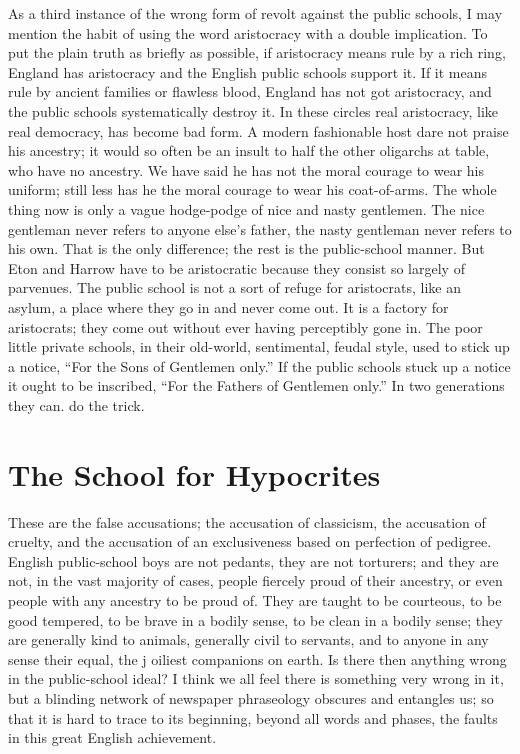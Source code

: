 \documentclass{book}
\begin{document}
As a third instance of the wrong form of revolt against the public schools, I may mention the habit of using the word aristocracy with a double implication. To put the plain truth as briefly as possible, if aristocracy means rule by a rich ring, England has aristocracy and the English public schools support it. If it means rule by ancient families or flawless blood, England has not got aristocracy, and the public schools systematically destroy it. In these circles real aristocracy, like real democracy, has become bad form. A modern fashionable host dare not praise his ancestry; it would so often be an insult to half the other oligarchs at table, who have no ancestry. We have said he has not the moral courage to wear his uniform; still less has he the moral courage to wear his coat-of-arms. The whole thing now is only a vague hodge-podge of nice and nasty gentlemen. The nice gentleman never refers to anyone else’s father, the nasty gentleman never refers to his own. That is the only difference; the rest is the public-school manner. But Eton and Harrow have to be aristocratic because they consist so largely of parvenues. The public school is not a sort of refuge for aristocrats, like an asylum, a place where they go in and never come out. It is a factory for aristocrats; they come out without ever having perceptibly gone in. The poor little private schools, in their old-world, sentimental, feudal style, used to stick up a notice, “For the Sons of Gentlemen only.” If the public schools stuck up a notice it ought to be inscribed, “For the Fathers of Gentlemen only.” In two generations they can. do the trick.

\chapter{The School for Hypocrites}
\label{chapter-42}
These are the false accusations; the accusation of classicism, the accusation of cruelty, and the accusation of an exclusiveness based on perfection of pedigree. English public-school boys are not pedants, they are not torturers; and they are not, in the vast majority of cases, people fiercely proud of their ancestry, or even people with any ancestry to be proud of. They are taught to be courteous, to be good tempered, to be brave in a bodily sense, to be clean in a bodily sense; they are generally kind to animals, generally civil to servants, and to anyone in any sense their equal, the j oiliest companions on earth. Is there then anything wrong in the public-school ideal? I think we all feel there is something very wrong in it, but a blinding network of newspaper phraseology obscures and entangles us; so that it is hard to trace to its beginning, beyond all words and phases, the faults in this great English achievement.
\end{document}
